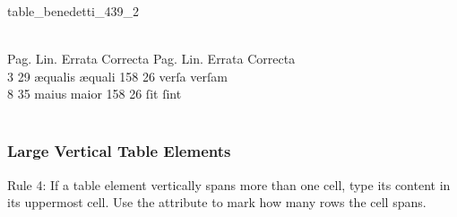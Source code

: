 \begin{sampleImage}{table_benedetti_439_2}
\begin{typeLatin}
 \\
Pag.  Lin.  Errata  Correcta \lwr{} Pag.  Lin.  Errata \lwr{} Correcta \\
3  29  æqualis  æquali \lwr{} 158  26  verſa  verſam \\
8  35  maius  maior \lwr{} 158  26  ſit  ſint \\
\untranscribedText \\
\end{typeLatin}

\end{sampleImage}



\subsubsection{Large Vertical Table Elements}
\label{section large vertical table elements}

\begin{mainrule}
Rule 4: If a table element vertically spans more than one cell, type its content in its uppermost cell. Use the attribute  to mark how many rows the cell spans.
\end{mainrule}

